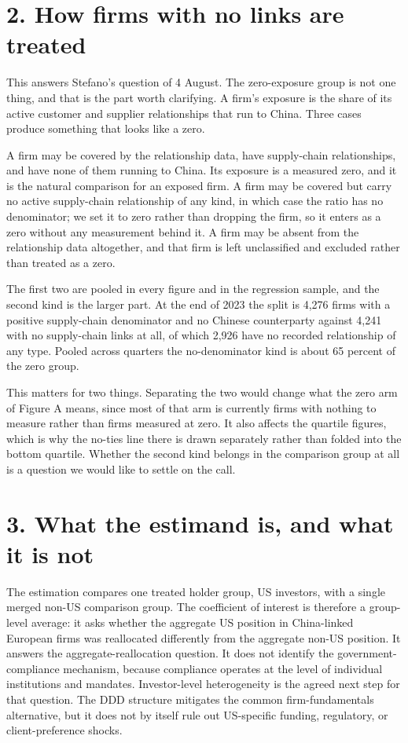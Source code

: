 \documentclass[11pt]{article}
\begin{document}
\section*{2. How firms with no links are treated}

This answers Stefano's question of 4 August. The zero-exposure group is not
one thing, and that is the part worth clarifying. A firm's exposure is the
share of its active customer and supplier relationships that run to China.
Three cases produce something that looks like a zero.

A firm may be covered by the relationship data, have supply-chain
relationships, and have none of them running to China. Its exposure is a
measured zero, and it is the natural comparison for an exposed firm. A firm
may be covered but carry no active supply-chain relationship of any kind, in
which case the ratio has no denominator; we set it to zero rather than
dropping the firm, so it enters as a zero without any measurement behind it. A
firm may be absent from the relationship data altogether, and that firm is
left unclassified and excluded rather than treated as a zero.

The first two are pooled in every figure and in the regression sample, and the
second kind is the larger part. At the end of 2023 the split is 4,276 firms
with a positive supply-chain denominator and no Chinese counterparty against
4,241 with no supply-chain links at all, of which 2,926 have no recorded
relationship of any type. Pooled across quarters the no-denominator kind is
about 65 percent of the zero group.

This matters for two things. Separating the two would change what the zero arm
of Figure A means, since most of that arm is currently firms with nothing to
measure rather than firms measured at zero. It also affects the quartile
figures, which is why the no-ties line there is drawn separately rather than
folded into the bottom quartile. Whether the second kind belongs in the
comparison group at all is a question we would like to settle on the call.

\section*{3. What the estimand is, and what it is not}

The estimation compares one treated holder group, US investors, with a single
merged non-US comparison group. The coefficient of interest is therefore a
group-level average: it asks whether the aggregate US position in China-linked
European firms was reallocated differently from the aggregate non-US position.
It answers the aggregate-reallocation question. It does not identify the
government-compliance mechanism, because compliance operates at the level of
individual institutions and mandates. Investor-level heterogeneity is the
agreed next step for that question. The DDD structure mitigates the common
firm-fundamentals alternative, but it does not by itself rule out US-specific
funding, regulatory, or client-preference shocks.
\end{document}
